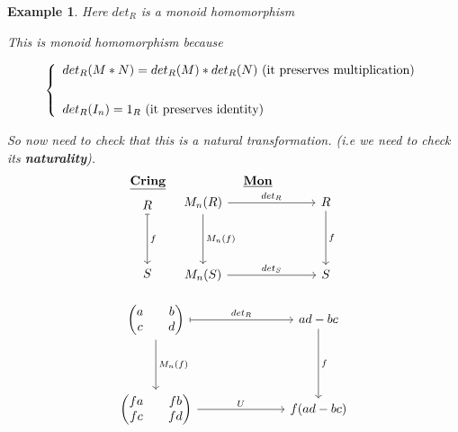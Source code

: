 \documentclass{article}
\newtheorem{example}{Example}[section]
\begin{document}
\begin{example}
        Here \(det_R\) is a monoid homomorphism

        This is monoid homomorphism because

        \[
            \left\{
            \begin{array}{ll}
                det_R(M * N) = det_R(M) * det_R(N) \text{ (it preserves multiplication)} \\
                \vspace{0.1in}                                                           \\
                det_R(I_n) = 1_R   \text{ (it preserves identity)}                          \\
            \end{array}
            \right.
        \]

        So now need to check that this is a natural transformation. (i.e we need to check its \textbf{naturality}).
        \[
            \begin{array}{c c} %
                \underline{\mathbf{Cring}} & \underline{\mathbf{Mon}} \\
                \begin{tikzcd}[column sep=4em, row sep=4em]
                    R \arrow[d, mapsto, "f"] \\
                    S
                \end{tikzcd}
                &
                \begin{tikzcd}[column sep=7em, row sep=4em]
                    M_n(R) \arrow[r, "det_R"] \arrow[d, "M_n(f)"]
                    & R \arrow[d, "f"] \\
                    M_n(S) \arrow[r, "det_S"]
                    & S
                \end{tikzcd}
            \end{array}
        \]

        \[
            \begin{tikzcd}[column sep=7em, row sep=4em]
                \begin{pmatrix}
                    a & b \\ c & d
                \end{pmatrix}
                \arrow[r, mapsto,  "det_R"] \arrow[d, "M_n(f)"]
                & ad - bc \arrow[d, "f"] \\
                \begin{pmatrix}
                    fa & fb \\ fc & fd
                \end{pmatrix}
                \arrow[r, "U"]
                & f(ad -bc)
            \end{tikzcd}
        \]

    \end{example}
\end{document}

